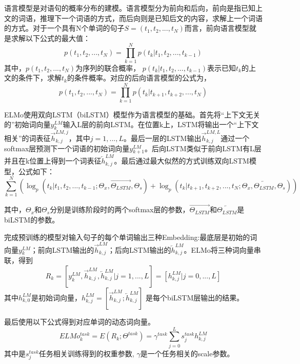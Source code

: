 语言模型是对语句的概率分布的建模。语言模型分为前向和后向，前向是指已知上文的词语，推理下一个词语的方式，而后向则是已知后文的内容，求解上一个词语的方式。对于一个具有N个单词的句子$S=(t_1, t_2, ..., t_N)$而言，前向语言模型就是求解以下公式的最大值：
\begin{equation}
p(t_1, t_2, ..., t_N)=\prod_{k=1}^N p(t_k|t_1,t_2,...,t_{k-1})
\end{equation}
其中，$p(t_1, t_2, ..., t_N)$为序列的联合概率，
$p(t_k|t_1, t_2,..., t_{k-1})$表示已知$t_k$的上文的条件下，求解$t_k$的条件概率。对应的后向语言模型的公式为，
\begin{equation}
p(t_1, t_2, ..., t_N)=\prod_{k=1}^N p(t_k|t_{k+1},t_{k+2},...,t_N)
\end{equation}

ELMo使用双向LSTM（biLSTM）模型作为语言模型的基础。首先将“上下文无关的”初始词向量$y{_k^{LM}}$输入L层的前向LSTM。在位置k上，LSTM将输出一个“上下文相关”的词表征$\vec{h}_{k,j}^{LM,j}$，其中$j = 1, ..., L$。最后一层的LSTM输出$\vec{h}_{k,j}^{LM,L}$通过一个softmax层预测下一个词语的初始词向量$y{_{k+1}^{LM}}$。后向LSTM类似于前向LSTM有L层并且在k位置上得到一个词表征$\overleftarrow{h}_{k,j}^{LM}$。最后通过最大似然的方式训练双向LSTM模型，公式如下：
\begin{equation}
\sum_{k=1}^N(\log_p(t_k|t_1, t_2,..., t_{k-1};\Theta_x,\overrightarrow{\Theta_{LSTM}},\Theta_s) + \log_p(t_k|t_{k+1},t_{k+2},...,t_N;\Theta_x,\overleftarrow{\Theta_{LSTM}},\Theta_s)
)
\end{equation}

其中，$\Theta_x$和$\Theta_s$分别是训练阶段时的两个softmax层的参数，$\overrightarrow{\Theta_{LSTM}}$和$\overleftarrow{\Theta_{LSTM}}$是biLSTM的参数。

完成预训练的模型对输入句子的每个单词输出三种Embedding:最底层是初始的词向量$y{_k^{LM}}$；前向LSTM输出的$\overrightarrow{h}_{k,j}^{LM}$；后向LSTM输出的$\overleftarrow{h}_{k,j}^{LM}$。ELMo将三种词向量串联，得到
\begin{equation}
R_k = 
[y_k^{LM}, \overrightarrow{h}_{k,j}^{LM}, \overleftarrow{h}_{k,j}^{LM} | j = 1, ..., L]
= [h_{k,j}^{LM} | j = 0, ..., L]
\end{equation}
其中$h_{k,0}^{LM}$是初始词向量，$h_{k,j}^{LM} = [\overrightarrow{h}_{k,j}^{LM}; \overleftarrow{h}_{k,j}^{LM}]$ 是每个biLSTM层输出的结果。

最后使用以下公式得到对应单词的动态词向量。
\begin{equation}
ELMo_k^{task} = E(R_k; \Theta^{task}) = \gamma^{task}\sum_{j=0}^L s_j^{task} h_{k,j}^{LM}
\end{equation}
其中是$s_j^{task}$任务相关训练得到的权重参数, $\gamma$是一个任务相关的scale参数。

